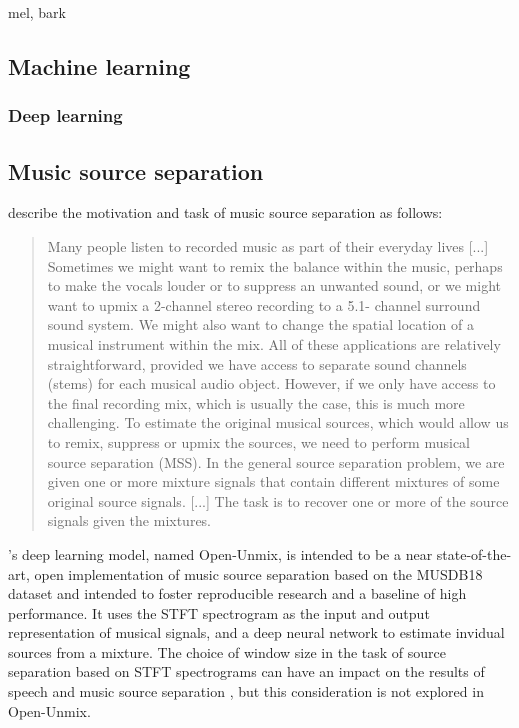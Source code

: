 \documentclass[report.tex]{subfiles}
\begin{document}
mel, bark

\vfill
\clearpage

\subsection{Machine learning}
\label{sec:ml}


\subsubsection{Deep learning}
\label{sec:dl}

\vfill
\clearpage

\subsection{Music source separation}
\label{sec:musicsep}

\textcite{musicsepgood} describe the motivation and task of music source separation as follows:

\begin{quote}
	Many people listen to recorded music as part of their everyday lives [...] Sometimes we might want to remix the balance within the music, perhaps to make the vocals louder or to suppress an unwanted sound, or we might want to upmix a 2-channel stereo recording to a 5.1- channel surround sound system. We might also want to change the spatial location of a musical instrument within the mix. All of these applications are relatively straightforward, provided we have access to separate sound channels (stems) for each musical audio object. However, if we only have access to the final recording mix, which is usually the case, this is much more challenging. To estimate the original musical sources, which would allow us to remix, suppress or upmix the sources, we need to perform musical source separation (MSS). In the general source separation problem, we are given one or more mixture signals that contain different mixtures of some original source signals. [...] The task is to recover one or more of the source signals given the mixtures.
\end{quote}

\textcite{umx}'s deep learning model, named Open-Unmix, is intended to be a near state-of-the-art, open implementation of music source separation based on the MUSDB18 dataset \cite{musdb18} and intended to foster reproducible research and a baseline of high performance. It uses the STFT spectrogram as the input and output representation of musical signals, and a deep neural network to estimate invidual sources from a mixture. The choice of window size in the task of source separation based on STFT spectrograms can have an impact on the results of speech and music source separation \cite{musicsepwindow}, but this consideration is not explored in Open-Unmix.
\end{document}
